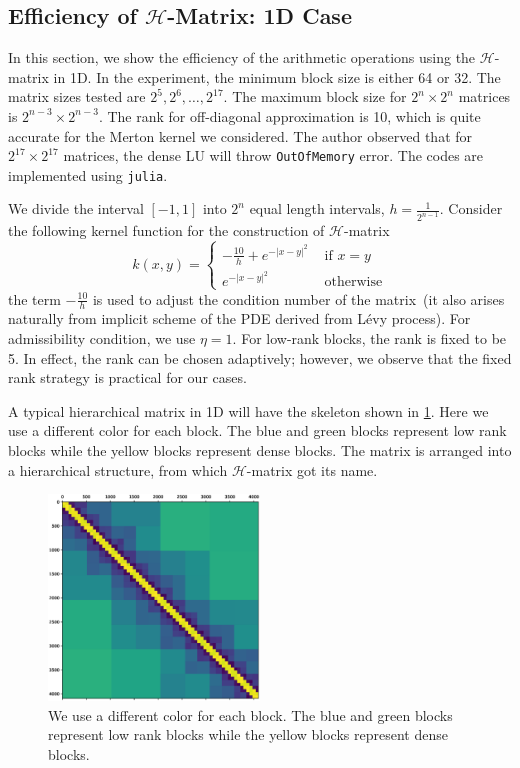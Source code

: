 \documentclass[3p,,preprint,12pt]{elsarticle}
\theoremstyle{definition}
\begin{document}
\subsection{Efficiency of $\mathcal{H}$-Matrix: 1D Case}

In this section, we show the efficiency of the arithmetic operations using the $\mathcal{H}$-matrix in 1D. In the experiment, the minimum block size is either 64 or 32. The matrix sizes tested are $2^5, 2^6, \ldots, 2^{17}$. The maximum block size for $2^n\times 2^n$ matrices is $2^{n-3}\times 2^{n-3}$. The rank for off-diagonal approximation is 10, which is quite accurate for the Merton kernel we considered. The author observed that for $2^{17}\times 2^{17}$ matrices, the dense LU will throw \texttt{OutOfMemory} error. The codes are implemented using \texttt{julia}. 


We divide the interval $[-1,1]$ into $2^n$ equal length intervals, $h=\frac{1}{2^{n-1}}$. Consider the following kernel function for the construction of $\mathcal{H}$-matrix
\begin{equation}
	k(x,y) = \begin{cases}
		-\frac{10}{h} + e^{-|x-y|^2} & \mbox{ if } x=y\\
		e^{-|x-y|^2} & \mbox{ otherwise}
	\end{cases}
\end{equation}
the term $-\frac{10}{h}$ is used to adjust the condition number of the matrix~(it also arises naturally from implicit scheme of the PDE derived from L\'evy process). For admissibility condition,  we use $\eta=1$. For low-rank blocks, the rank is fixed to be 5. In effect, the rank can be chosen adaptively; however, we observe that the fixed rank strategy is practical for our cases. 

A typical hierarchical matrix in 1D will have the skeleton shown in \cref{fig:1D}. Here we use a different color for each block. The blue and green blocks represent low rank blocks while the yellow blocks represent dense blocks. The matrix is arranged into a hierarchical structure, from which $\mathcal{H}$-matrix got its name. 

\begin{figure}[H] %
\centering
\includegraphics[width=0.5\textwidth,keepaspectratio]{figures/1D}
\caption{We use a different color for each block. The blue and green blocks represent low rank blocks while the yellow blocks represent dense blocks.}
\label{fig:1D}
\end{figure} 
\end{document}
